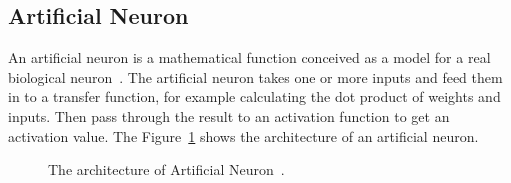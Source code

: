 \documentclass[]{UCD_CS_FYP_Report}
\begin{document}
\subsection{Artificial Neuron}
An artificial neuron is a mathematical function conceived as a model for a real biological neuron~\cite{Bonnin:2016}. The artificial neuron takes one or more inputs and feed them in to a transfer function, for example calculating the dot product of weights and inputs. Then pass through the result to an activation function to get an activation value. The Figure~\ref{fig:The architecture of Artificial Neuron} shows the architecture of an artificial neuron.
\begin{figure}[h]
\centering
\fboxsep 2mm
\caption{\label{fig:The architecture of Artificial Neuron} The architecture of Artificial Neuron~\cite{Gibson:2017}.}
\end{figure} 
\end{document}
